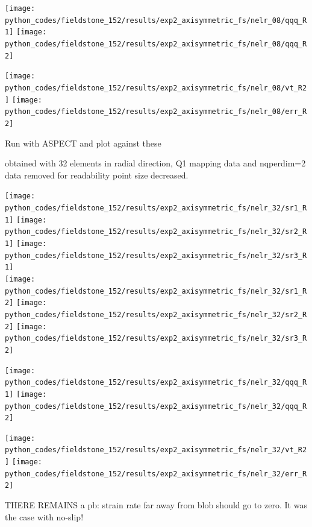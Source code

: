 \begin{center}
\texttt{[image: python\_codes/fieldstone\_152/results/exp2\_axisymmetric\_fs/nelr\_08/qqq\_R1]}
\texttt{[image: python\_codes/fieldstone\_152/results/exp2\_axisymmetric\_fs/nelr\_08/qqq\_R2]}
\end{center}

\begin{center}
\texttt{[image: python\_codes/fieldstone\_152/results/exp2\_axisymmetric\_fs/nelr\_08/vt\_R2]}
\texttt{[image: python\_codes/fieldstone\_152/results/exp2\_axisymmetric\_fs/nelr\_08/err\_R2]}
\end{center}

Run with ASPECT and plot against these





\newpage
obtained with 32 elements in radial direction, Q1 mapping data and nqperdim=2 data removed for readability
point size decreased.

\begin{center}
\texttt{[image: python\_codes/fieldstone\_152/results/exp2\_axisymmetric\_fs/nelr\_32/sr1\_R1]}
\texttt{[image: python\_codes/fieldstone\_152/results/exp2\_axisymmetric\_fs/nelr\_32/sr2\_R1]}
\texttt{[image: python\_codes/fieldstone\_152/results/exp2\_axisymmetric\_fs/nelr\_32/sr3\_R1]}\\
\texttt{[image: python\_codes/fieldstone\_152/results/exp2\_axisymmetric\_fs/nelr\_32/sr1\_R2]}
\texttt{[image: python\_codes/fieldstone\_152/results/exp2\_axisymmetric\_fs/nelr\_32/sr2\_R2]}
\texttt{[image: python\_codes/fieldstone\_152/results/exp2\_axisymmetric\_fs/nelr\_32/sr3\_R2]}\\
\end{center}

\begin{center}
\texttt{[image: python\_codes/fieldstone\_152/results/exp2\_axisymmetric\_fs/nelr\_32/qqq\_R1]}
\texttt{[image: python\_codes/fieldstone\_152/results/exp2\_axisymmetric\_fs/nelr\_32/qqq\_R2]}
\end{center}

\begin{center}
\texttt{[image: python\_codes/fieldstone\_152/results/exp2\_axisymmetric\_fs/nelr\_32/vt\_R2]}
\texttt{[image: python\_codes/fieldstone\_152/results/exp2\_axisymmetric\_fs/nelr\_32/err\_R2]}
\end{center}


THERE REMAINS a pb: strain rate far away from blob should go to zero. It was the case with no-slip!

